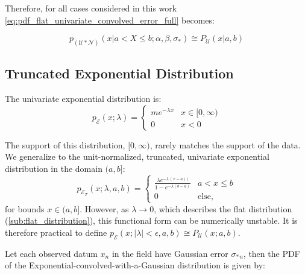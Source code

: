 \documentclass[twocolumn]{aastex631}
\newcommand{\mcal}[1]{\mathcal{#1}}
\newcommand{\Exp}[1]{e^{#1}}
\newcommand{\pdf}{p}
\newcommand{\sigobs}{{\sigma_*}}
\begin{document}
        Therefore, for all cases considered in this work
        \eqref{eq:pdf_flat_univariate_convolved_error_full} becomes:

        \begin{equation}\label{eq:pdf_flat_univariate_convolved_error}
            \pdf_{(\mcal{U}*\mcal{N})}(x | a < X \leq b; \alpha, \beta, \sigobs) \cong P_{\mcal{U}}(x|a,b)
        \end{equation}
        

    \vspace{10pt}
    \subsection{Truncated Exponential Distribution} \label{app:sub:exponential_distribution}
    
        The univariate exponential distribution is:
        \begin{equation} \label{eq:pdf_exp_univariate}
            \pdf_{\mcal{E}}(x; \lambda) = \begin{cases}
                m \Exp{-\lambda x} & x \in [0, \infty) \\
                0 & x < 0
            \end{cases}
        \end{equation}
    
        The support of this distribution, $[0, \infty)$, rarely matches the
        support of the data. We generalize to the unit-normalized, truncated,
        univariate exponential distribution in the domain $(a, b]$:
        \begin{equation} \label{eq:pdf_truncexp_univariate}
            \pdf_{\mcal{E}_T}(x; \lambda, a, b) = \begin{cases}
                \frac{\lambda \Exp{-\lambda \, (x - a))}}{1 - \Exp{-\lambda(b - a)}} & a < x \leq b \\
                0 & \text{else},
            \end{cases}
        \end{equation}
        for bounds $x \in (a,b]$. However, as $\lambda \rightarrow 0$, which
        describes the flat distribution (\autoref{sub:flat_distribution}), this
        functional form can be numerically unstable. It is therefore practical
        to define $\pdf_{\mcal{E}}(x; |\lambda| < \epsilon, a, b) \cong
        P_{\mcal{U}}(x; a,b)$.

        Let each observed datum $x_n$ in the field have Gaussian error
        $\sigobs_n$, then the PDF of the Exponential-convolved-with-a-Gaussian
        distribution is given by:
\end{document}

